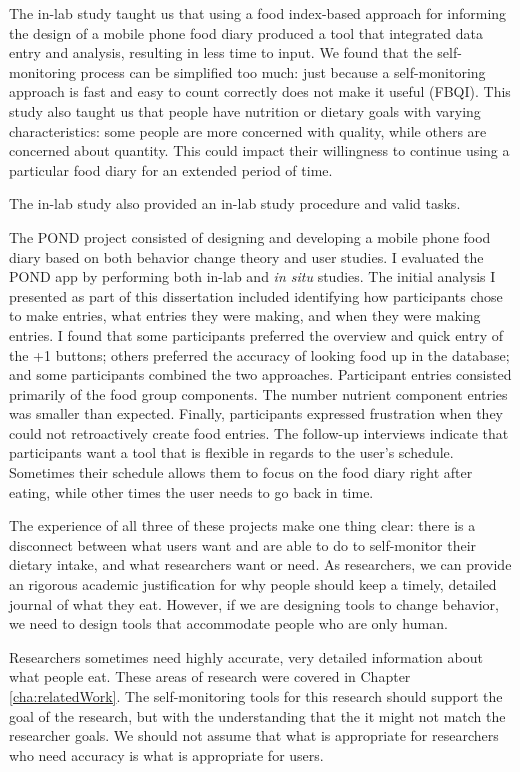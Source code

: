 The in-lab study taught us that using a food index-based approach for informing the design of a mobile phone food diary produced a tool that integrated data entry and analysis, resulting in less time to input. We found that the self-monitoring process can be simplified too much: just because a self-monitoring approach is fast and easy to count correctly does not make it useful (FBQI). This study also taught us that people have nutrition or dietary goals with varying characteristics: some people are more concerned with quality, while others are concerned about quantity. This could impact their willingness to continue using a particular food diary for an extended period of time. 

The in-lab study also provided an in-lab study procedure and valid tasks. 

The POND project consisted of designing and developing a mobile phone food diary based on both behavior change theory and user studies. I evaluated the POND app by performing both in-lab and \textit{in situ} studies. The initial analysis I presented as part of this dissertation included identifying how participants chose to make entries, what entries they were making, and when they were making entries. I found that some participants preferred the overview and quick entry of the +1 buttons; others preferred the accuracy of looking food up in the database; and some participants combined the two approaches. Participant entries consisted primarily of the food group components. The number nutrient component entries was smaller than expected. Finally, participants expressed frustration when they could not retroactively create food entries. The follow-up interviews indicate that participants want a tool that is flexible in regards to the user's schedule. Sometimes their schedule allows them to focus on the food diary right after eating, while other times the user needs to go back in time. 

The experience of all three of these projects make one thing clear: there is a disconnect between what users want and are able to do to self-monitor their dietary intake, and what researchers want or need. As researchers, we can provide an rigorous academic justification for why people should keep a timely, detailed journal of what they eat. However, if we are designing tools to change behavior, we need to design tools that accommodate people who are only human. 

Researchers sometimes need highly accurate, very detailed information about what people eat. These areas of research were covered in Chapter \ref{cha:relatedWork}. The self-monitoring tools for this research should support the goal of the research, but with the understanding that the it might not match the researcher goals. We should not  assume that what is appropriate for researchers who need accuracy is what is appropriate for users. 

